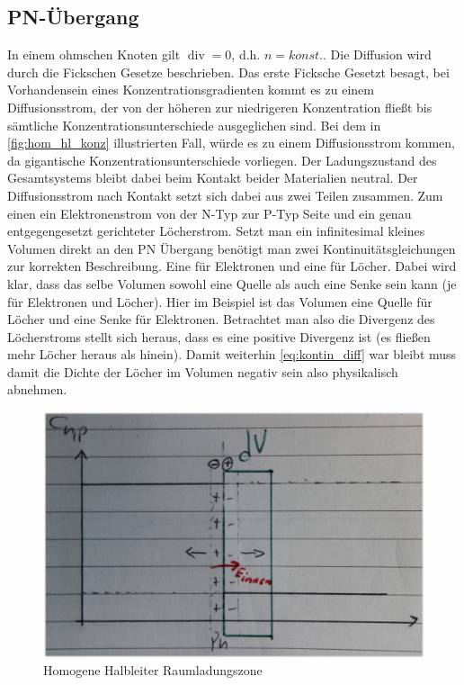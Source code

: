 \documentclass[12pt,a4paper]{report}%
\DeclareMathOperator{\diverg}{div}
\numberwithin{equation}{section}
\numberwithin{equation}{subsection}
\begin{document}
	\subsection{PN-Übergang}
	In einem ohmschen Knoten gilt $\diverg = 0$, d.h. $n = konst.$. Die Diffusion wird durch die Fickschen Gesetze beschrieben. Das erste Ficksche Gesetzt besagt, bei Vorhandensein eines Konzentrationsgradienten kommt es zu einem Diffusionsstrom, der von der höheren zur niedrigeren Konzentration fließt bis sämtliche Konzentrationsunterschiede ausgeglichen sind. Bei dem in \eqref{fig:hom_hl_konz} illustrierten Fall, würde es zu einem Diffusionsstrom kommen, da gigantische Konzentrationsunterschiede vorliegen. Der Ladungszustand des Gesamtsystems bleibt dabei beim Kontakt beider Materialien neutral. Der Diffusionsstrom nach Kontakt setzt sich dabei aus zwei Teilen zusammen. Zum einen ein Elektronenstrom von der N-Typ zur P-Typ Seite und ein genau entgegengesetzt gerichteter Löcherstrom. \newline
	Setzt man ein infinitesimal kleines Volumen direkt an den PN Übergang benötigt man zwei Kontinuitätsgleichungen zur korrekten Beschreibung. Eine für Elektronen und eine für Löcher. Dabei wird klar, dass das selbe Volumen sowohl eine Quelle als auch eine Senke sein kann (je für Elektronen und Löcher). Hier im Beispiel ist das Volumen eine Quelle für Löcher und eine Senke für Elektronen. Betrachtet man also die Divergenz des Löcherstroms stellt sich heraus, dass es eine positive Divergenz ist (es fließen mehr Löcher heraus als hinein). Damit weiterhin \eqref{eq:kontin_diff} war bleibt muss damit die Dichte der Löcher im Volumen negativ sein also physikalisch abnehmen. 
  \begin{figure}[H]
	  \centering
	  \captionsetup{justification=centering}
	  \includegraphics[width=0.6\linewidth]{hom_hl_rlz.png}
	  \caption{Homogene Halbleiter Raumladungszone}
	  \label{fig:hom_hl_rlz}
	\end{figure}
\end{document}
